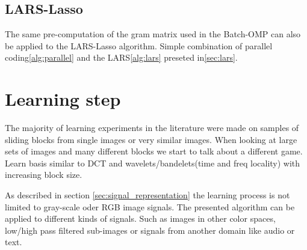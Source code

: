 


\subsection{LARS-Lasso}
The same pre-computation of the gram matrix used in the Batch-OMP can also
be applied to the LARS-Lasso algorithm. Simple combination of
parallel coding\ref{alg:parallel} and the LARS\ref{alg:lars} preseted
in\ref{sec:lars}.


\section{Learning step}
The majority of learning experiments in the literature were made on
samples of sliding blocks from single images or very similar images.
When looking at large sets of images and many different blocks we start to talk
about a different game.
Learn basis similar to DCT and wavelets/bandelets(time and freq locality) with
increasing block size.

As described in section \ref{sec:signal_representation} the learning process is
not limited to gray-scale oder RGB image signals. The presented algorithm can be
applied to different kinds of signals. Such as images in other color
spaces, low/high pass filtered sub-images or signals from another domain like
audio or text. 

